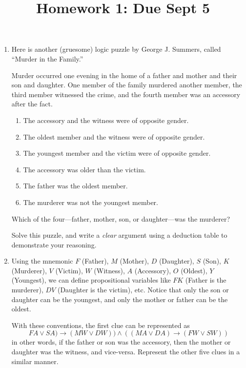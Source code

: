 \documentclass[12pt]{amsart}
\theoremstyle{definition}
\begin{document}
\title{Homework 1: Due Sept 5}

\maketitle

\begin{enumerate}

\item Here is another (gruesome) logic puzzle by George J. Summers, 
called “Murder in the Family.”

Murder occurred one evening in the home of a father and mother
and their son and daughter. One member of the family murdered
another member, the third member witnessed the crime, and the
fourth member was an accessory after the fact.

\begin{enumerate}
\item The accessory and the witness were of opposite gender.
\item The oldest member and the witness were of opposite gender.
\item The youngest member and the victim were of opposite gender.
\item The accessory was older than the victim.
\item The father was the oldest member.
\item The murderer was not the youngest member.
\end{enumerate}
Which of the four—father, mother, son, or daughter—was the murderer?

Solve this puzzle, and write a \textit{clear} argument using a 
deduction table to demonstrate your reasoning.

\item Using the mnemonic $F$ (Father), $M$ (Mother), $D$ (Daughter), 
$S$ (Son), $K$ (Murderer), $V$ (Victim), $W$ (Witness), $A$ 
(Accessory), $O$ (Oldest), $Y$ (Youngest), we can define propositional 
variables like $FK$ (Father is the murderer), $DV$ (Daughter is 
the victim), etc.
Notice that only the son or daughter can be the youngest, and only the mother
or father can be the oldest.

With these conventions, the first clue can be represented as
\begin{displaymath}
FA \lor SA) \to (MW \lor DW)) \land ((MA \lor DA) \to (FW \lor SW))
\end{displaymath}
in other words, if the father or son was the accessory, then the mother or
daughter was the witness, and vice-versa. Represent the other five clues in a
similar manner.


\end{enumerate}
\end{document}
